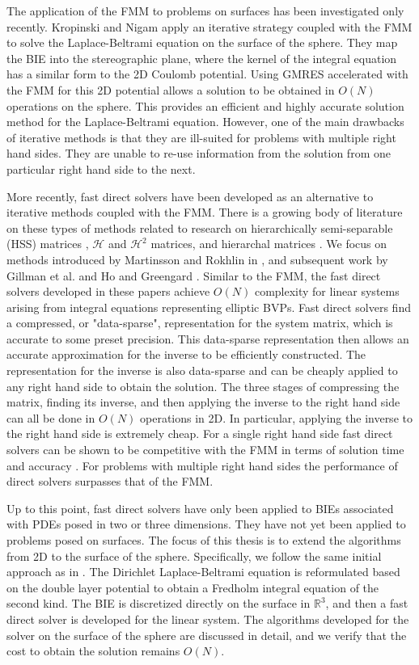 \documentclass{sfuthesis}
\begin{document}
The application of the FMM to problems on surfaces has been investigated only recently. Kropinski and Nigam \cite{KropNig2014} apply an iterative strategy coupled with the FMM to solve the Laplace-Beltrami equation on the surface of the sphere. They map the BIE into the stereographic plane, where the kernel of the integral equation has a similar form to the 2D Coulomb potential. Using GMRES accelerated with the FMM for this 2D potential allows a solution to be obtained in $O(N)$ operations on the sphere. This provides an efficient and highly accurate solution method for the Laplace-Beltrami equation. However, one of the main drawbacks of iterative methods is that they are ill-suited for problems with multiple right hand sides. They are unable to re-use information from the solution from one particular right hand side to the next. 

More recently, fast direct solvers have been developed as an alternative to iterative methods coupled with the FMM. There is a growing body of literature on these types of methods related to research on hierarchically semi-separable (HSS) matrices \cite{Xia2009}, $\mathcal{H}$ \cite{Hack99} and $\mathcal{H}^2$  \cite{Bjorn2010} matrices, and hierarchal matrices \cite{Stein2007}. We focus on methods introduced by Martinsson and Rokhlin in \cite{MartRokh2005}, and subsequent work by Gillman et al. \cite{GillYoungMart2012} and Ho and Greengard \cite{HoGreen2012}. Similar to the FMM, the fast direct solvers developed in these papers achieve $O(N)$ complexity for linear systems arising from integral equations representing elliptic BVPs. Fast direct solvers find a compressed, or "data-sparse", representation for the system matrix, which is accurate to some preset precision. This data-sparse representation then allows an accurate approximation for the inverse to be efficiently constructed. The representation for the inverse is also data-sparse and can be cheaply applied to any right hand side to obtain the solution. The three stages of compressing the matrix, finding its inverse, and then applying the inverse to the right hand side can all be done in $O(N)$ operations in 2D. In particular, applying the inverse to the right hand side is extremely cheap. For a single right hand side fast direct solvers can be shown to be competitive with the FMM in terms of solution time and accuracy \cite{HoGreen2012}. For problems with multiple right hand sides the performance of direct solvers surpasses that of the FMM. 

Up to this point, fast direct solvers have only been applied to BIEs associated with PDEs posed in two or three dimensions. They have not yet been applied to problems posed on surfaces. The focus of this thesis is to extend the algorithms from 2D to the surface of the sphere. Specifically, we follow the same initial approach as in \cite{KropNig2014}. The Dirichlet Laplace-Beltrami equation is reformulated based on the double layer potential to obtain a Fredholm integral equation of the second kind. The BIE is discretized directly on the surface in $\mathbb{R}^3$, and then a fast direct solver is developed for the linear system. The algorithms developed for the solver on the surface of the sphere are discussed in detail, and we verify that the cost to obtain the solution remains $O(N)$. 
\end{document}
